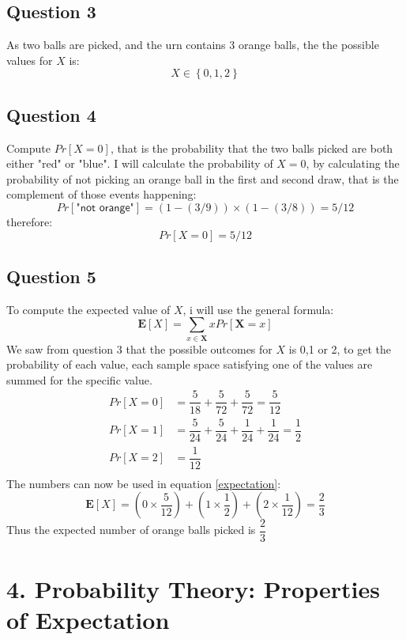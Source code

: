 \documentclass{article}
\begin{document}
\subsection{Question 3}
As two balls are picked, and the urn contains 3 orange balls, the the possible values for $X$ is:
$$ X \in \left\lbrace 0,1,2 \right\rbrace $$
\subsection{Question 4}
Compute $Pr[X = 0]$, that is the probability that the two balls picked are both either "red" or "blue". I will calculate the probability of $X = 0$, by calculating the probability of not picking an orange ball in the first and second draw, that is the complement of those events happening:
$$ Pr[\textsf{"not orange"}] = \left(1-(3/9)\right) \times \left(1-(3/8)\right) = 5/12 $$
therefore:
$$ Pr[X=0] = 5/12 $$
\subsection{Question 5}
To compute the expected value of $X$, i will use the general formula:
\begin{equation}
\mathbf{E}[X] = \sum\limits_{x \in \mathbf{X}} x  Pr[\mathbf{X} = x]
\label{expectation}
\end{equation}
We saw from question 3 that the possible outcomes for $X$ is 0,1 or 2, to get the probability of each value, each sample space satisfying one of the values are summed for the specific value.
\begin{align*}
Pr[X=0] &= \dfrac{5}{18} + \dfrac{5}{72} + \dfrac{5}{72} = \dfrac{5}{12} \\
Pr[X=1] &= \dfrac{5}{24} + \dfrac{5}{24} + \dfrac{1}{24} + \dfrac{1}{24} = \dfrac{1}{2} \\
Pr[X=2] &= \dfrac{1}{12} \\
\end{align*}
The numbers can now be used in equation \eqref{expectation}:
$$
\mathbf{E}[X] = (0 \times \dfrac{5}{12}) + (1 \times \dfrac{1}{2}) + (2 \times \dfrac{1}{12}) = \dfrac{2}{3}
$$
Thus the expected number of orange balls picked is $ \dfrac{2}{3}$
\section{4. Probability Theory: Properties of Expectation }
\end{document}
